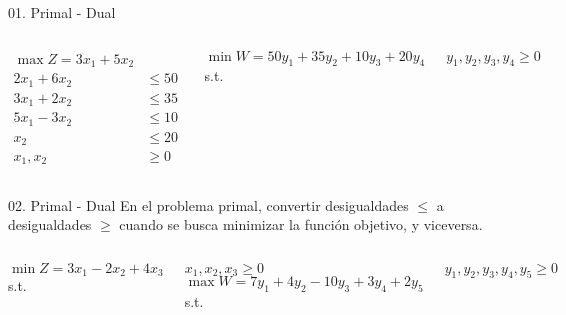 \begin{frameExample}{01. Primal - Dual}{}
  \begin{columns}
        \begin{align*}
      \max Z = 3x_1 + 5x_2 & \\[3mm]
    2x_1 + 6x_2 & \leq 50\\
    3x_1 + 2x_2 & \leq 35\\
    5x_1 - 3x_2 & \leq 10\\
    x_2 & \leq 20\\[5mm]
    x_1, x_2 & \geq 0
        \end{align*}
        
                 \[      \min W = 50y_1 + 35y_2  + 10y_3 + 20y_4  \]
                  s.t.  %
  
  $    y_1, y_2, y_3, y_4  \geq 0$
  \end{columns}
\end{frameExample}


\begin{frameExample}{02. Primal - Dual}{}
En el problema primal, convertir desigualdades $\leq$ a desigualdades $\geq$ cuando se busca \alert{minimizar} la función objetivo, y viceversa.
  \begin{columns}
\[      \min Z = 3x_1 - 2x_2 + 4x_3  \]
s.t.%

          $    x_1, x_2, x_3  \geq 0$
                 \[      \max W = 7y_1 + 4y_2  - 10y_3 + 3y_4 + 2y_5  \]
                  s.t.  %
  
  $    y_1, y_2, y_3, y_4, y_5  \geq 0$
  \end{columns}
\end{frameExample}


